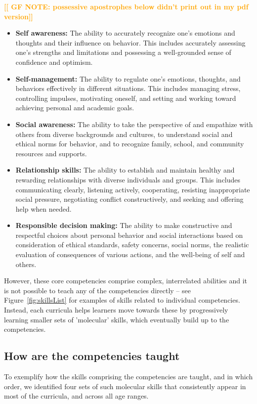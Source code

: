 \documentclass[prodmode,acmtochi]{acmsmall}
\newcommand{\Geraldine}[1]{\textrm{\textbf{\textcolor{Orange}{[[#1]]}}}}
\begin{document}
\Geraldine{ GF NOTE: possessive apostrophes below didn't print out in my pdf version}
\begin{itemize}
        \item {\bf Self awareness: }
                        The ability to accurately recognize one’s emotions and thoughts and their influence on behavior. This includes accurately assessing one’s strengths and limitations and possessing a well-grounded sense of confidence and optimism.
        \item {\bf Self-management: }
                         The ability to regulate one’s emotions, thoughts, and behaviors effectively in different situations. This includes managing stress, controlling impulses, motivating oneself, and setting and working toward achieving personal and academic goals.
        \item {\bf Social awareness: }
                         The ability to take the perspective of and empathize with others from diverse backgrounds and cultures, to understand social and ethical norms for behavior, and to recognize family, school, and community resources and supports.
        \item {\bf Relationship skills: }
                        The ability to establish and maintain healthy and rewarding relationships with diverse individuals and groups. This includes communicating clearly, listening actively, cooperating, resisting inappropriate social pressure, negotiating conflict constructively, and seeking and offering help when needed.
        \item {\bf Responsible decision making: }
                        The ability to make constructive and respectful choices about personal behavior and social interactions based on consideration of ethical standards, safety concerns, social norms, the realistic evaluation of consequences of various actions, and the well-being of self and others.
\end{itemize}
However, these core competencies comprise complex, interrelated abilities and it is not possible to teach any of the competencies directly -- see Figure~\ref{fig:skillsList} for examples of skills related to individual competencies. 
Instead, each curricula helps learners move towards these by progressively learning smaller sets of 'molecular' skills, which eventually build up to the competencies. 

\subsection{How are the competencies taught}
To exemplify how the skills comprising the competencies are taught, and in which order, we identified four sets of such molecular skills that consistently appear in most of the curricula, and across all age ranges. 
\end{document}
